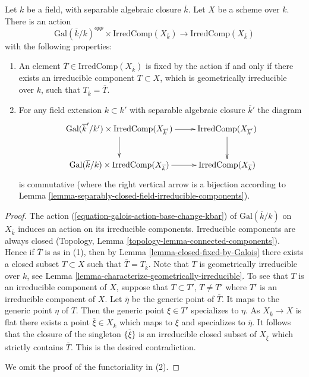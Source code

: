 \begin{lemma}
\label{lemma-galois-action-irreducible-components}
Let $k$ be a field, with separable algebraic closure $\overline{k}$.
Let $X$ be a scheme over $k$.
There is an action
$$
\text{Gal}(\overline{k}/k)^{opp} \times \text{IrredComp}(X_{\overline{k}})
\longrightarrow
\text{IrredComp}(X_{\overline{k}})
$$
with the following properties:
\begin{enumerate}
\item An element $\overline{T} \in \text{IrredComp}(X_{\overline{k}})$
is fixed by the action if and only if there exists an irreducible
component $T \subset X$, which is geometrically irreducible over $k$,
such that $T_{\overline{k}} = \overline{T}$.
\item For any field extension $k \subset k'$ with separable
algebraic closure $\overline{k}'$ the diagram
$$
\xymatrix{
\text{Gal}(\overline{k}'/k') \times \text{IrredComp}(X_{\overline{k}'})
\ar[r] \ar[d] &
\text{IrredComp}(X_{\overline{k}'}) \ar[d] \\
\text{Gal}(\overline{k}/k) \times \text{IrredComp}(X_{\overline{k}})
\ar[r] &
\text{IrredComp}(X_{\overline{k}})
}
$$
is commutative (where the right vertical arrow is a bijection
according to Lemma \ref{lemma-separably-closed-field-irreducible-components}).
\end{enumerate}
\end{lemma}

\begin{proof}
The action (\ref{equation-galois-action-base-change-kbar})
of $\text{Gal}(\overline{k}/k)$ on $X_{\overline{k}}$
induces an action on its irreducible components.
Irreducible components are always closed
(Topology, Lemma \ref{topology-lemma-connected-components}).
Hence if $\overline{T}$ is as in (1), then by
Lemma \ref{lemma-closed-fixed-by-Galois} there exists a closed
subset $T \subset X$ such that $\overline{T} = T_{\overline{k}}$.
Note that $T$ is geometrically irreducible over $k$, see
Lemma \ref{lemma-characterize-geometrically-irreducible}.
To see that $T$ is an irreducible component of $X$, suppose that
$T \subset T'$, $T \not = T'$ where $T'$ is an irreducible
component of $X$. Let $\overline{\eta}$ be the generic point of
$\overline{T}$. It maps to the generic point $\eta$ of $T$.
Then the generic point $\xi \in T'$ specializes to $\eta$.
As $X_{\overline{k}} \to X$ is flat there exists a point
$\overline{\xi} \in X_{\overline{k}}$ which maps to $\xi$ and
specializes to $\overline{\eta}$. It follows that
the closure of the singleton $\{\overline{\xi}\}$ is an
irreducible closed subset of $X_{\overline{\xi}}$ which
strictly contains $\overline{T}$. This is the desired contradiction.

\medskip\noindent
We omit the proof of the functoriality in (2).
\end{proof}













